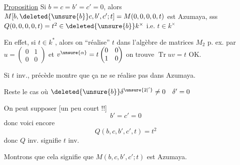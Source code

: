 \uline{Proposition} Si $b=c=b'=c'=0$, alors $M[b,\deleted{\unsure{b}}c,b',c';t]=M(0,0,0,0,t)$ est Azumaya, sss  $Q(0,0,0,0,t)=t^2\in\deleted{\unsure{b}}k^\times$ i.e. $t\in k^\times$

En effet, si $t\in k^*$, alors on ``réalise'' $t$ dans l'algèbre de matrices $M_2$ p. ex. par $u=\begin{pmatrix}0&1\\0&0\end{pmatrix}$ et $v^{\unsure{\alpha}}=t\begin{pmatrix}0&0\\1&0\end{pmatrix}$ on trouve $\operatorname{Tr}uv=t$ OK.

Si $t$  inv.,   précède montre que ça ne se réalise pas dans Azumaya.


Reste le cas où $\deleted{\unsure{b}}\delta^{\unsure{2|'}}\ne0\quad\delta'=0$

 On peut supposer [un peu court !!]
\[
b'=c'=0
\]
donc voici encore
\[
Q(b,c,b',c',t)=t^2
\]
donc $Q$ inv. signifie $t$ inv.

Montrons que cela signifie que $M(b,c,b',c';t)$ est Azumaya.
